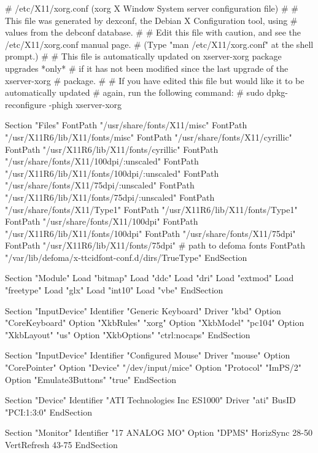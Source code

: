 \documentclass[mingoth,a4paper]{jsarticle}
\begin{document}
\begin{commandline}
# /etc/X11/xorg.conf (xorg X Window System server configuration file)
#
# This file was generated by dexconf, the Debian X Configuration tool, using
# values from the debconf database.
#
# Edit this file with caution, and see the /etc/X11/xorg.conf manual page.
# (Type "man /etc/X11/xorg.conf" at the shell prompt.)
#
# This file is automatically updated on xserver-xorg package upgrades *only*
# if it has not been modified since the last upgrade of the xserver-xorg
# package.
#
# If you have edited this file but would like it to be automatically updated
# again, run the following command:
#   sudo dpkg-reconfigure -phigh xserver-xorg

Section "Files"
	FontPath	"/usr/share/fonts/X11/misc"
	FontPath	"/usr/X11R6/lib/X11/fonts/misc"
	FontPath	"/usr/share/fonts/X11/cyrillic"
	FontPath	"/usr/X11R6/lib/X11/fonts/cyrillic"
	FontPath	"/usr/share/fonts/X11/100dpi/:unscaled"
	FontPath	"/usr/X11R6/lib/X11/fonts/100dpi/:unscaled"
	FontPath	"/usr/share/fonts/X11/75dpi/:unscaled"
	FontPath	"/usr/X11R6/lib/X11/fonts/75dpi/:unscaled"
	FontPath	"/usr/share/fonts/X11/Type1"
	FontPath	"/usr/X11R6/lib/X11/fonts/Type1"
	FontPath	"/usr/share/fonts/X11/100dpi"
	FontPath	"/usr/X11R6/lib/X11/fonts/100dpi"
	FontPath	"/usr/share/fonts/X11/75dpi"
	FontPath	"/usr/X11R6/lib/X11/fonts/75dpi"
	# path to defoma fonts
	FontPath	"/var/lib/defoma/x-ttcidfont-conf.d/dirs/TrueType"
EndSection

Section "Module"
	Load	"bitmap"
	Load	"ddc"
	Load	"dri"
	Load	"extmod"
	Load	"freetype"
	Load	"glx"
	Load	"int10"
	Load	"vbe"
EndSection

Section "InputDevice"
	Identifier	"Generic Keyboard"
	Driver		"kbd"
	Option		"CoreKeyboard"
	Option		"XkbRules"	"xorg"
	Option		"XkbModel"	"pc104"
	Option		"XkbLayout"	"us"
	Option		"XkbOptions"	"ctrl:nocaps"
EndSection

Section "InputDevice"
	Identifier	"Configured Mouse"
	Driver		"mouse"
	Option		"CorePointer"
	Option		"Device"		"/dev/input/mice"
	Option		"Protocol"		"ImPS/2"
	Option		"Emulate3Buttons"	"true"
EndSection

Section "Device"
	Identifier	"ATI Technologies Inc ES1000"
	Driver		"ati"
	BusID		"PCI:1:3:0"
EndSection

Section "Monitor"
	Identifier	"17 ANALOG MO"
	Option		"DPMS"
	HorizSync	28-50
	VertRefresh	43-75
EndSection

\end{commandline}
\end{document}
